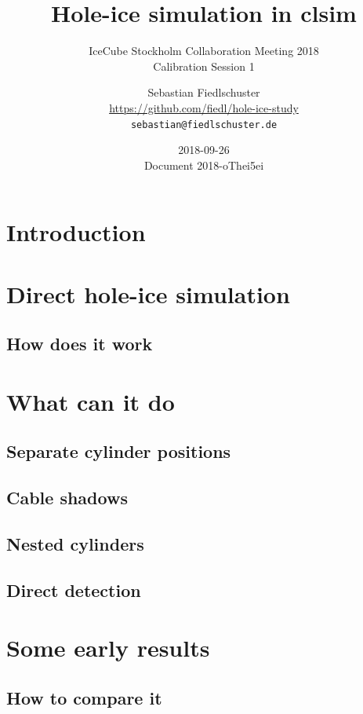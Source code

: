 \documentclass[green, 12pt]{beamer}
\title{Hole-ice simulation in clsim}
\subtitle{IceCube Stockholm Collaboration Meeting 2018 \\ Calibration Session 1}
\date[2018-09-26]{2018-09-26 \\ \vspace*{2mm} \tiny{Document 2018-oThei5ei}}
\author[Sebastian Fiedlschuster, ECAP Erlangen]{Sebastian Fiedlschuster \\ \tiny{\url{https://github.com/fiedl/hole-ice-study}} \\ \tiny\texttt{sebastian@fiedlschuster.de}}
\institute{Erlangen Centre for Astroparticle Physics}
\newif\ifplacelogo %
\begin{document}



\placelogofalse

\section{Introduction}
  
  


  \section{Direct hole-ice simulation}
  \subsection{How does it work}
    

  \section{What can it do}
  \subsection{Separate cylinder positions}
    
  \subsection{Cable shadows}
    
  \subsection{Nested cylinders}
    
    
  \subsection{Direct detection}
    

  \section{Some early results}
  \subsection{How to compare it}
    
\end{document}
